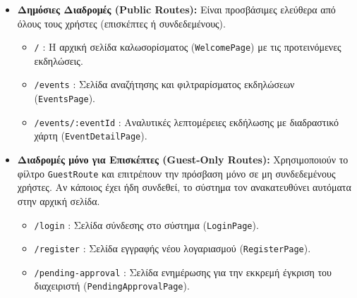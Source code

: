 \documentclass[12pt]{fphw}
\newcommand{\en}[1]{\foreignlanguage{english}{#1}}
\begin{document}
\begin{itemize}[leftmargin=*, itemsep=6pt]
    \item \textbf{Δημόσιες Διαδρομές (\en{Public Routes}):} Είναι προσβάσιμες ελεύθερα από όλους τους χρήστες (επισκέπτες ή συνδεδεμένους).
        \begin{itemize}[leftmargin=0.6cm, itemsep=2pt]
            \item \en{\texttt{/}} : Η αρχική σελίδα καλωσορίσματος (\en{\texttt{WelcomePage}}) με τις προτεινόμενες εκδηλώσεις.
            \item \en{\texttt{/events}} : Σελίδα αναζήτησης και φιλτραρίσματος εκδηλώσεων (\en{\texttt{EventsPage}}).
            \item \en{\texttt{/events/:eventId}} : Αναλυτικές λεπτομέρειες εκδήλωσης με διαδραστικό χάρτη (\en{\texttt{EventDetailPage}}).
        \end{itemize}

    \item \textbf{Διαδρομές μόνο για Επισκέπτες (\en{Guest-Only Routes}):} Χρησιμοποιούν το φίλτρο \en{\texttt{GuestRoute}} και επιτρέπουν την πρόσβαση μόνο σε μη συνδεδεμένους χρήστες. Αν κάποιος έχει ήδη συνδεθεί, το σύστημα τον ανακατευθύνει αυτόματα στην αρχική σελίδα.
        \begin{itemize}[leftmargin=0.6cm, itemsep=2pt]
            \item \en{\texttt{/login}} : Σελίδα σύνδεσης στο σύστημα (\en{\texttt{LoginPage}}).
            \item \en{\texttt{/register}} : Σελίδα εγγραφής νέου λογαριασμού (\en{\texttt{RegisterPage}}).
            \item \en{\texttt{/pending-approval}} : Σελίδα ενημέρωσης για την εκκρεμή έγκριση του διαχειριστή (\en{\texttt{PendingApprovalPage}}).
        \end{itemize}


\end{itemize}
\end{document}
